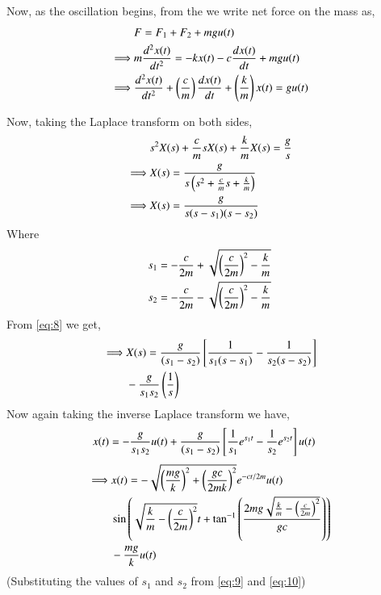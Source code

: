 \documentclass[journal,12pt,twocolumn]{IEEEtran}
\theoremstyle{remark}
\begin{document}
    Now, as the oscillation begins, from the  we write net force on the mass as,
    \begin{align}
        &F=F_{1}+F_{2}+mgu(t) \label{eq:3}\\
        \implies &m\frac{d^2x(t)}{dt^2}=-kx(t)-c\frac{dx(t)}{dt}+mgu(t) \label{eq:4}\\
        \implies &\frac{d^2x(t)}{dt^2}+\brak{\frac{c}{m}}\frac{dx(t)}{dt}+\brak{\frac{k}{m}}x(t)=gu(t) \label{eq:5}
    \end{align}

    Now, taking the Laplace transform on both sides,
    \begin{align}
        &s^2X(s)+\frac{c}{m}sX(s)+\frac{k}{m}X(s)=\frac{g}{s} \label{eq:6}\\
        \implies &X(s)=\frac{g}{s\brak{s^2+\frac{c}{m}s+\frac{k}{m}}} \label{eq:7}\\
        \implies &X(s)=\frac{g}{s(s-s_1)(s-s_2)} \label{eq:8}
    \end{align}
    Where
    \begin{align}
        &s_1=-\frac{c}{2m}+\sqrt{\brak{\frac{c}{2m}}^2-\frac{k}{m}} \label{eq:9}\\
        &s_2=-\frac{c}{2m}-\sqrt{\brak{\frac{c}{2m}}^2-\frac{k}{m}} \label{eq:10}
    \end{align}
    From \eqref{eq:8} we get,
    \begin{align}
        \begin{split}
            \implies &X(s)=\frac{g}{(s_1-s_2)}\sbrak{\frac{1}{s_1(s-s_1)}-\frac{1}{s_2(s-s_2)}} \\
            &-\frac{g}{s_1s_2}\brak{\frac{1}{s}} \label{eq:11}
        \end{split}
    \end{align}
    Now again taking the inverse Laplace transform we have,
    \begin{align}
        &x(t)=-\frac{g}{s_1s_2}u(t)+\frac{g}{(s_1-s_2)}\sbrak{\frac{1}{s_1}e^{s_1t}-\frac{1}{s_2}e^{s_2t}}u(t)\label{eq:12}
    \end{align}
    \begin{align}
    \begin{split}
    \implies &x(t) = -\sqrt{\brak{\frac{mg}{k}}^2 + \brak{\frac{gc}{2mk}}^2}e^{-ct/2m}u(t) \\
            &\sin{\brak{\sqrt{\frac{k}{m} - \brak{\frac{c}{2m}}^2}t + \tan^{-1}\brak{\frac{2mg\sqrt{\frac{k}{m} - \brak{\frac{c}{2m}}^2}}{gc}}}} \\
            &- \frac{mg}{k}
        u(t) \label{eq:13}
\end{split}
\end{align}
    (Substituting the values of $s_1$ and $s_2$ from \eqref{eq:9} and \eqref{eq:10})
\end{document}
